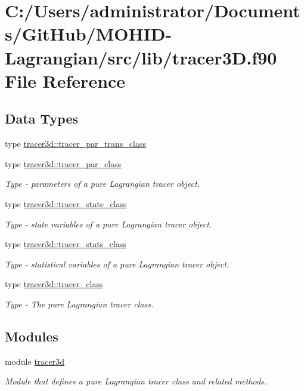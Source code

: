 \hypertarget{tracer3_d_8f90}{}\section{C\+:/\+Users/administrator/\+Documents/\+Git\+Hub/\+M\+O\+H\+I\+D-\/\+Lagrangian/src/lib/tracer3D.f90 File Reference}
\label{tracer3_d_8f90}
\subsection*{Data Types}
\begin{DoxyCompactItemize}
\item 
type \mbox{\hyperlink{structtracer3d_1_1tracer__par__trans__class}{tracer3d\+::tracer\+\_\+par\+\_\+trans\+\_\+class}}
\item 
type \mbox{\hyperlink{structtracer3d_1_1tracer__par__class}{tracer3d\+::tracer\+\_\+par\+\_\+class}}
\begin{DoxyCompactList}\small\item\em Type -\/ parameters of a pure Lagrangian tracer object. \end{DoxyCompactList}\item 
type \mbox{\hyperlink{structtracer3d_1_1tracer__state__class}{tracer3d\+::tracer\+\_\+state\+\_\+class}}
\begin{DoxyCompactList}\small\item\em Type -\/ state variables of a pure Lagrangian tracer object. \end{DoxyCompactList}\item 
type \mbox{\hyperlink{structtracer3d_1_1tracer__stats__class}{tracer3d\+::tracer\+\_\+stats\+\_\+class}}
\begin{DoxyCompactList}\small\item\em Type -\/ statistical variables of a pure Lagrangian tracer object. \end{DoxyCompactList}\item 
type \mbox{\hyperlink{structtracer3d_1_1tracer__class}{tracer3d\+::tracer\+\_\+class}}
\begin{DoxyCompactList}\small\item\em Type -\/ The pure Lagrangian tracer class. \end{DoxyCompactList}\end{DoxyCompactItemize}
\subsection*{Modules}
\begin{DoxyCompactItemize}
\item 
module \mbox{\hyperlink{namespacetracer3d}{tracer3d}}
\begin{DoxyCompactList}\small\item\em Module that defines a pure Lagrangian tracer class and related methods. \end{DoxyCompactList}\end{DoxyCompactItemize}
